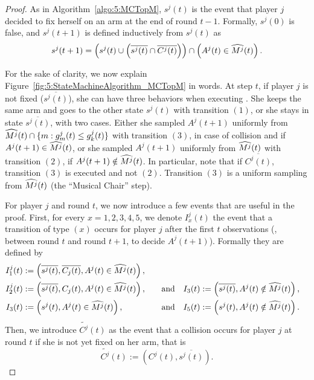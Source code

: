 \begin{proof}

  As in Algorithm~\ref{algo:5:MCTopM}, $s^j(t)$ is the event that player $j$ decided to fix herself on an arm at the end of round $t-1$.
  Formally, $s^j(0)$ is false, and $s^j(t+1)$ is defined inductively from $s^j(t)$ as
  \begin{equation}
      s^j(t+1) =
      \left( s^j(t) \cup \left( \overline{s^j(t)} \cap \overline{C^j(t)} \right) \right)
      \cap \left( A^j(t) \in \widehat{M^j}(t) \right).
  \end{equation}

  For the sake of clarity, we now explain Figure~\ref{fig:5:StateMachineAlgorithm_MCTopM} in words. At step $t$, if player $j$ is not fixed ($\overline{s^j(t)}$), she can have three behaviors when executing \MCTopM.
  She keeps the same arm and goes to the other state $s^j(t)$ with transition $(1)$,
  or she stays in state $\overline{s^j(t)}$,
  with two cases.
  Either she sampled $A^j(t+1)$ uniformly
  from $\widehat{M^j}(t) \cap \{ m : g_m^j(t) \leq g_k^j(t) \}$
  with transition $(3)$,
  in case of collision and if $A^j(t+1) \in \widehat{M^j}(t)$,
  or she sampled $A^j(t+1)$ uniformly
  from $\widehat{M^j}(t)$ with transition $(2)$,
  if $A^j(t+1) \notin \widehat{M^j}(t)$.
  In particular, note that if $\overline{C^j(t)}$, transition $(3)$ is executed and not $(2)$.
  Transition $(3)$ is a uniform sampling from $\widehat{M^j}(t)$ (the ``Musical Chair'' step).


  For player $j$ and round $t$, we now introduce a few events that are useful in the proof. First, for every $x=1,2,3,4,5$, we denote $I_x^j(t)$ the event that a transition of type $(x)$ occurs for player $j$ after the first $t$ observations (\ie, between round $t$ and round $t+1$, to decide $A^j(t+1)$).
  Formally they are defined by
  \begin{align*}
    I_1^j(t) &:= \left(\overline{s^j(t)},\overline{C_j(t)}, A^j(t) \in \widehat{M^j}(t)\right), \\
    I_2^j(t) &:= \left(\overline{s^j(t)},C_j(t), A^j(t) \in \widehat{M^j}(t)\right),
    \ \ \ &\text{and} \ \ \
    I_3(t) &:= \left(\overline{s^j(t)},A^j(t) \notin \widehat{M^j}(t)\right), \\
    I_3(t) &:= \left(s^j(t),A^j(t) \in \widehat{M^j}(t)\right),
    \ \ \ &\text{and} \ \ \
    I_5(t) &:= \left(s^j(t),A^j(t) \notin \widehat{M^j}(t)\right).
  \end{align*}
  Then, we introduce $\widetilde{C^j}(t)$ as the event that a collision occurs for player $j$ at round $t$ if she is not yet fixed on her arm, that is
  \begin{equation}
      \widetilde{C^j}(t) := \left(C^j(t), \overline{s^j(t)}\right).
  \end{equation}



\end{proof}
